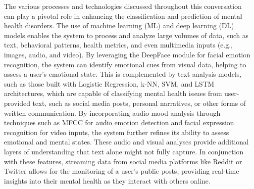 \noindent
The various processes and technologies discussed throughout this conversation can play a pivotal role in enhancing the classification and prediction of mental health disorders. The use of machine learning (ML) and deep learning (DL) models enables the system to process and analyze large volumes of data, such as text, behavioral patterns, health metrics, and even multimedia inputs (e.g., images, audio, and video). By leveraging the DeepFace module for facial emotion recognition, the system can identify emotional cues from visual data, helping to assess a user’s emotional state. This is complemented by text analysis models, such as those built with Logistic Regression, k-NN, SVM, and LSTM architectures, which are capable of classifying mental health issues from user-provided text, such as social media posts, personal narratives, or other forms of written communication. By incorporating audio mood analysis through techniques such as MFCC for audio emotion detection and facial expression recognition for video inputs, the system further refines its ability to assess emotional and mental states. These audio and visual analyses provide additional layers of understanding that text alone might not fully capture. In conjunction with these features, streaming data from social media platforms like Reddit or Twitter allows for the monitoring of a user’s public posts, providing real-time insights into their mental health as they interact with others online. 












